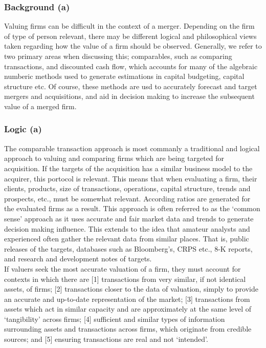 \documentclass[11pt, english]{article}
\begin{document}
		\subsubsection*{Background (a)}
        
        Valuing firms can be difficult in the context of a merger. Depending on the firm of type of person relevant, there may be different logical and philosophical views taken regarding how the value of a firm should be observed. Generally, we refer to two primary areas when discussing this; comparables, such as comparing transactions, and discounted cash flow, which accounts for many of the algebraic numberic methods used to generate estimations in capital budgeting, capital structure etc. Of course, these methods are usd to accurately forecast and target mergers and acquisitions, and aid in decision making to increase the subsequent value of a merged firm.

                \subsubsection*{Logic (a)}

        The comparable transaction approach is most commanly a traditional and logical approach to valuing and comparing firms which are being targeted for acquisition. If the targets of the acquisition has a similar business model to the acquirer, this portocol is relevant. This means that when evaluating a firm, their clients, products, size of transactions, operations, capital structure, trends and prospects, etc., must be somewhat relevant. According ratios are generated for the evaluated firms as a result. This approach is often referred to as the `common sense' approach as it uses accurate and fair market data and trends to generate decision making influence. This extends to the idea that amateur analysts and experienced often gather the relevant data from similar places. That is, public releases of the targets, databases such as Bloomberg's, CRPS etc., 8-K reports, and research and development notes of targets.\\

        If valuers seek the most accurate valuation of a firm, they must account for contexts in which there are [1] transactions from very similar, if not identical assets, of firms; [2] transactions closer to the data of valuation, simply to provide an accurate and up-to-date representation of the market; [3] transactions from assets which act in similar capacity and are approximately at the same level of `tangibility' across firms; [4] sufficient and similar types of information surrounding assets and transactions across firms, which originate from credible sources; and [5] ensuring transactions are real and not `intended'.
\end{document}
